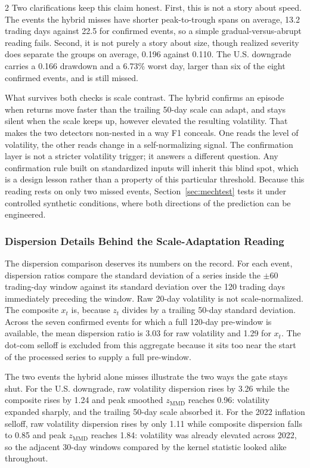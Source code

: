 \documentclass{book}
\begin{document}
\begin{multicols}{2}
Two clarifications keep this claim honest. First, this is not a story about speed. The events the hybrid misses have shorter peak-to-trough spans on average, 13.2 trading days against 22.5 for confirmed events, so a simple gradual-versus-abrupt reading fails. Second, it is not purely a story about size, though realized severity does separate the groups on average, 0.196 against 0.110. The U.S. downgrade carries a 0.166 drawdown and a 6.73\% worst day, larger than six of the eight confirmed events, and is still missed.

What survives both checks is scale contrast. The hybrid confirms an episode when returns move faster than the trailing 50-day scale can adapt, and stays silent when the scale keeps up, however elevated the resulting volatility. That makes the two detectors non-nested in a way F1 conceals. One reads the level of volatility, the other reads change in a self-normalizing signal. The confirmation layer is not a stricter volatility trigger; it answers a different question. Any confirmation rule built on standardized inputs will inherit this blind spot, which is a design lesson rather than a property of this particular threshold. Because this reading rests on only two missed events, Section~\ref{sec:mechtest} tests it under controlled synthetic conditions, where both directions of the prediction can be engineered.

\subsubsection{Dispersion Details Behind the Scale-Adaptation Reading}
\label{sec:dispersion}
The dispersion comparison deserves its numbers on the record. For each event, dispersion ratios compare the standard deviation of a series inside the $\pm60$ trading-day window against its standard deviation over the 120 trading days immediately preceding the window. Raw 20-day volatility is not scale-normalized. The composite $x_t$ is, because $z_t$ divides by a trailing 50-day standard deviation. Across the seven confirmed events for which a full 120-day pre-window is available, the mean dispersion ratio is 3.03 for raw volatility and 1.29 for $x_t$. The dot-com selloff is excluded from this aggregate because it sits too near the start of the processed series to supply a full pre-window.

The two events the hybrid alone misses illustrate the two ways the gate stays shut. For the U.S. downgrade, raw volatility dispersion rises by 3.26 while the composite rises by 1.24 and peak smoothed $z_{\mathrm{MMD}}$ reaches 0.96: volatility expanded sharply, and the trailing 50-day scale absorbed it. For the 2022 inflation selloff, raw volatility dispersion rises by only 1.11 while composite dispersion falls to 0.85 and peak $z_{\mathrm{MMD}}$ reaches 1.84: volatility was already elevated across 2022, so the adjacent 30-day windows compared by the kernel statistic looked alike throughout.


\end{multicols}
\end{document}

